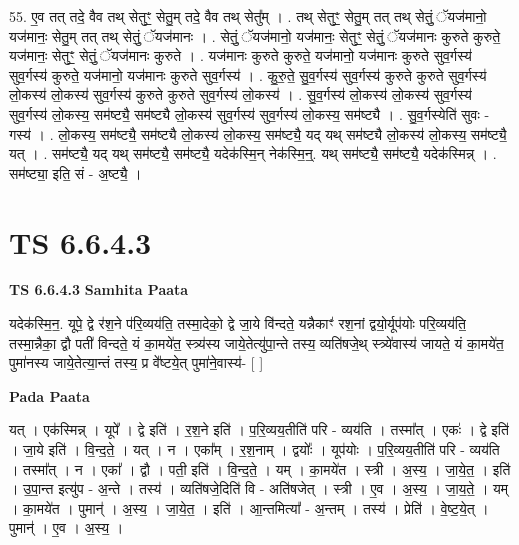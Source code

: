 \documentclass[17pt]{extarticle}
\begin{document}
55. ए॒व तत् तदे॒ वैव तथ् सेतुꣳ॒॒ सेतु॒म् तदे॒ वैव तथ् सेतु᳚म् । . तथ् सेतुꣳ॒॒ सेतु॒म् तत् तथ् सेतुं॒ ॅयज॑मानो॒ यज॑मानः॒ सेतु॒म् तत् तथ् सेतुं॒ ॅयज॑मानः । . सेतुं॒ ॅयज॑मानो॒ यज॑मानः॒ सेतुꣳ॒॒ सेतुं॒ ॅयज॑मानः कुरुते कुरुते॒ यज॑मानः॒ सेतुꣳ॒॒ सेतुं॒ ॅयज॑मानः कुरुते । . यज॑मानः कुरुते कुरुते॒ यज॑मानो॒ यज॑मानः कुरुते सुव॒र्गस्य॑ सुव॒र्गस्य॑ कुरुते॒ यज॑मानो॒ यज॑मानः कुरुते सुव॒र्गस्य॑ । . कु॒रु॒ते॒ सु॒व॒र्गस्य॑ सुव॒र्गस्य॑ कुरुते कुरुते सुव॒र्गस्य॑ लो॒कस्य॑ लो॒कस्य॑ सुव॒र्गस्य॑ कुरुते कुरुते सुव॒र्गस्य॑ लो॒कस्य॑ । . सु॒व॒र्गस्य॑ लो॒कस्य॑ लो॒कस्य॑ सुव॒र्गस्य॑ सुव॒र्गस्य॑ लो॒कस्य॒ सम॑ष्ट्यै॒ सम॑ष्ट्यै लो॒कस्य॑ सुव॒र्गस्य॑ सुव॒र्गस्य॑ लो॒कस्य॒ सम॑ष्ट्यै । . सु॒व॒र्गस्येति॑ सुवः - गस्य॑ । . लो॒कस्य॒ सम॑ष्ट्यै॒ सम॑ष्ट्यै लो॒कस्य॑ लो॒कस्य॒ सम॑ष्ट्यै॒ यद् यथ् सम॑ष्ट्यै लो॒कस्य॑ लो॒कस्य॒ सम॑ष्ट्यै॒ यत् । . सम॑ष्ट्यै॒ यद् यथ् सम॑ष्ट्यै॒ सम॑ष्ट्यै॒ यदेक॑स्मि॒न् नेक॑स्मि॒न्॒. यथ् सम॑ष्ट्यै॒ सम॑ष्ट्यै॒ यदेक॑स्मिन्न् । . सम॑ष्ट्या॒ इति॒ सं - अ॒ष्ट्यै॒ । \newline
\pagebreak
{}

\section{ TS 6.6.4.3 }

\textbf{TS 6.6.4.3 } \newline
\textbf{Samhita Paata} \newline

यदेक॑स्मि॒न॒. यूपे॒ द्वे र॑श॒ने प॑रि॒व्यय॑ति॒ तस्मा॒देको॒ द्वे जा॒ये वि॑न्दते॒ यन्नैकाꣳ॑ रश॒नां द्वयो॒र्यूप॑योः परि॒व्यय॑ति॒ तस्मा॒न्नैका॒ द्वौ पती॑ विन्दते॒ यं का॒मये॑त॒ स्त्र्य॑स्य जाये॒तेत्यु॑पा॒न्ते तस्य॒ व्यति॑षजे॒थ् स्त्र्ये॑वास्य॑ जायते॒ यं का॒मये॑त॒ पुमा॑नस्य जाये॒तेत्या॒न्तं तस्य॒ प्र वे᳚ष्टये॒त् पुमा॑ने॒वास्य॑- [  ] \newline

\textbf{Pada Paata} \newline

यत् । एक॑स्मिन्न् । यूपे᳚ । द्वे इति॑ । र॒श॒ने इति॑ । प॒रि॒व्यय॒तीति॑ परि - व्यय॑ति । तस्मा᳚त् । एकः॑ । द्वे इति॑ । जा॒ये इति॑ । वि॒न्द॒ते॒ । यत् । न । एका᳚म् । र॒श॒नाम् । द्वयोः᳚ । यूप॑योः । प॒रि॒व्यय॒तीति॑ परि - व्यय॑ति । तस्मा᳚त् । न । एका᳚ । द्वौ । पती॒ इति॑ । वि॒न्द॒ते॒ । यम् । का॒मये॑त । स्त्री । अ॒स्य॒ । जा॒ये॒त॒ । इति॑ । उ॒पा॒न्त इत्यु॑प - अ॒न्ते । तस्य॑ । व्यति॑षजे॒दिति॑ वि - अति॑षजेत् । स्त्री । ए॒व । अ॒स्य॒ । जा॒य॒ते॒ । यम् । का॒मये॑त । पुमान्॑ । अ॒स्य॒ । जा॒ये॒त॒ । इति॑ । आ॒न्तमित्या᳚ - अ॒न्तम् । तस्य॑ । प्रेति॑ । वे॒ष्ट॒ये॒त् । पुमान्॑ । ए॒व । अ॒स्य॒ ।  \newline
\end{document}
